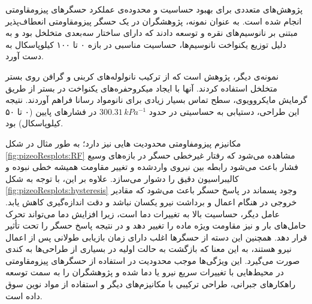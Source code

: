 	
	
	پژوهش‌های متعددی برای بهبود حساسیت و محدوده‌ی عملکرد حسگرهای پیزومقاومتی انجام شده است. به عنوان نمونه، پژوهشگران در
	\cite{jing2022ag} 
	یک حسگر پیزومقاومتی انعطاف‌‌پذیر مبتنی بر نانوسیم‌های نقره و 
	توسعه دادند که دارای ساختار سه‌بعدی متخلخل بود و به دلیل توزیع یکنواخت نانوسیم‌ها، حساسیت مناسبی در بازه ۰ تا ۱۰۰ کیلوپاسکال به دست آورد.  
	
	نمونه‌ی دیگر، پژوهش \cite{zhao2022pdms} است که از ترکیب نانولوله‌های کربنی و گرافن روی بستر
	متخلخل استفاده کردند. آنها با ایجاد میکروحفره‌های یکنواخت در بستر از طریق گرمایش مایکروویوی، سطح تماس بسیار زیادی برای نانومواد رسانا فراهم آوردند. نتیجه این طراحی، دستیابی به حساسیتی در حدود \(300.31 \, kPa^{-1}\) در فشارهای پایین (۰ تا ۵۰ کیلوپاسکال) بود.  
	
	مکانیزم پیزومفاومتی محدودیت هایی نیز دارد؛ به طور مثال در شکل
	\ref{fig:pizeoResplots:RF}
	مشاهده می‌شود که رفتار غیرخطی حسگر در بازه‌های وسیع فشار باعث می‌شود رابطه بین نیروی واردشده و تغییر مقاومت همیشه خطی نبوده و کالیبراسیون دقیق را دشوار می‌سازد.
	علاوه بر این، با توجه به شکل 
	\ref{fig:pizeoResplots:hysteresis}
	وجود پسماند
	در پاسخ حسگر باعث می‌شود که مقادیر خروجی در هنگام اعمال و برداشت نیرو یکسان نباشد و دقت اندازه‌گیری کاهش یابد. عامل دیگر، حساسیت بالا به تغییرات دما است، زیرا افزایش دما می‌تواند تحرک حامل‌های بار و نیز مقاومت ویژه ماده را تغییر دهد و در نتیجه پاسخ حسگر را تحت تأثیر قرار دهد. همچنین این دسته از حسگرها اغلب دارای زمان بازیابی طولانی پس از اعمال نیرو هستند، به این معنا که بازگشت به حالت اولیه در بسیاری از طراحی‌ها به کندی صورت می‌گیرد. این ویژگی‌ها موجب محدودیت در استفاده از حسگرهای پیزومقاومتی در محیط‌هایی با تغییرات سریع نیرو یا دما شده و پژوهشگران را به سمت توسعه راهکارهای جبرانی، طراحی ترکیبی با مکانیزم‌های دیگر و استفاده از مواد نوین سوق داده است.
	
